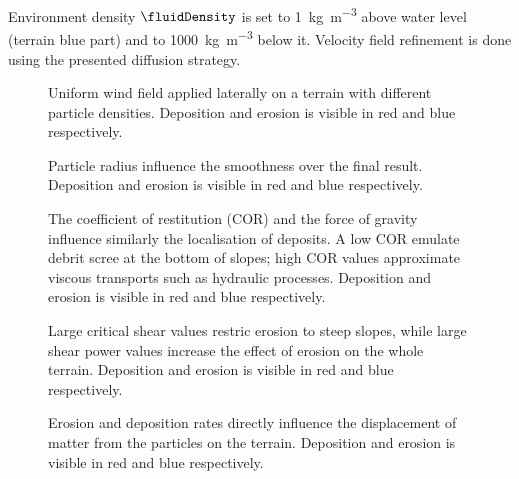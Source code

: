 Environment density $\fluidDensity$ is set to \SI{1}{\kilogram\per\cubic\meter} above water level (terrain blue part) and to \SI{1000}{\kilogram\per\cubic\meter} below it.  
Velocity field refinement is done using the presented diffusion strategy.


\begin{figure}
    \caption[Particle density and wind field]{Uniform wind field applied laterally on a terrain with different particle densities. Deposition and erosion is visible in red and blue respectively. }
    \label{fig:erosion-analysis-wind-density}
\end{figure}

\begin{figure}
    \caption[Particle radius influence]{Particle radius influence the smoothness over the final result. Deposition and erosion is visible in red and blue respectively. }
    \label{fig:erosion-analysis-radius}
\end{figure}

\begin{figure}
    \caption[Coefficient of restitution and gravity force influences]{The coefficient of restitution (COR) and the force of gravity influence similarly the localisation of deposits. A low COR emulate debrit scree at the bottom of slopes; high COR values approximate viscous transports such as hydraulic processes. Deposition and erosion is visible in red and blue respectively. }
    \label{fig:erosion-analysis-cor-gravity}
\end{figure}

\begin{figure}
    \caption[Critical shear value and shear power value influences]{Large critical shear values restric erosion to steep slopes, while large shear power values increase the effect of erosion on the whole terrain. Deposition and erosion is visible in red and blue respectively. }
    \label{fig:erosion-analysis-critical-shear-power}
\end{figure}

\begin{figure}
    \caption[Erosion and deposition rates influences]{Erosion and deposition rates directly influence the displacement of matter from the particles on the terrain. Deposition and erosion is visible in red and blue respectively. }
    \label{fig:erosion-analysis-deposition-erosion}
\end{figure}




